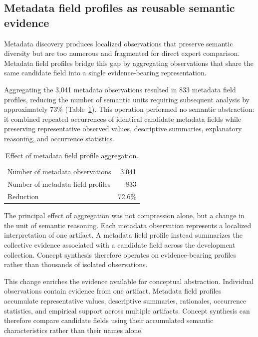 \documentclass{article}
\begin{document}
\subsection{Metadata field profiles as reusable semantic evidence}

Metadata discovery produces localized observations that preserve semantic diversity but are too numerous and fragmented for direct expert comparison. Metadata field profiles bridge this gap by aggregating observations that share the same candidate field into a single evidence-bearing representation.

Aggregating the 3,041 metadata observations resulted in 833 metadata field profiles, reducing the number of semantic units requiring subsequent analysis by approximately 73\% (Table~\ref{tab:aggregation_summary}). This operation performed no semantic abstraction: it combined repeated occurrences of identical candidate metadata fields while preserving representative observed values, descriptive summaries, explanatory reasoning, and occurrence statistics.

\begin{table}[!ht]
    \centering
    \caption{Effect of metadata field profile aggregation.}
    \label{tab:aggregation_summary}
    \begin{tabular}{lr}
        Number of metadata observations & 3,041 \\
        Number of metadata field profiles & 833 \\
        Reduction & 72.6\% \\
    \end{tabular}
\end{table}

The principal effect of aggregation was not compression alone, but a change in the unit of semantic reasoning. Each metadata observation represents a localized interpretation of one artifact. A metadata field profile instead summarizes the collective evidence associated with a candidate field across the development collection. Concept synthesis therefore operates on evidence-bearing profiles rather than thousands of isolated observations.

This change enriches the evidence available for conceptual abstraction. Individual observations contain evidence from one artifact. Metadata field profiles accumulate representative values, descriptive summaries, rationales, occurrence statistics, and empirical support across multiple artifacts. Concept synthesis can therefore compare candidate fields using their accumulated semantic characteristics rather than their names alone.
\end{document}

